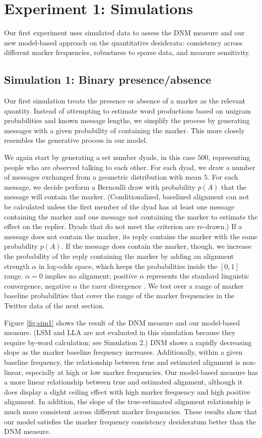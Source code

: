 \documentclass{acm_proc_article-sp}
\begin{document}
\section{Experiment 1: Simulations}
Our first experiment uses simulated data to assess the DNM measure and our new model-based approach on the quantitative desiderata: consistency across different marker frequencies, robustness to sparse data, and measure sensitivity.

\subsection{Simulation 1: Binary presence/absence}
Our first simulation treats the presence or absence of a marker as the relevant quantity. Instead of attempting to estimate word productions based on unigram probabilities and known message lengths, we simplify the process by generating messages with a given probability of containing the marker.  This more closely resembles the generative process in our model.

We again start by generating a set number dyads, in this case $500$, representing people who are observed talking to each other. For each dyad, we draw a number of messages exchanged from a geometric distribution with mean $5$. For each message, we decide perform a Bernoulli draw with probability $p(A)$ that the message will contain the marker.  (Conditionalized, baselined alignment can not be calculated unless the first member of the dyad has at least one message containing the marker and one message not containing the marker to estimate the effect on the replier. Dyads that do not meet the criterion are re-drawn.) If a message does not contain the marker, its reply contains the marker with the same probability $p(A)$. If the message does contain the marker, though, we increase the probability of the reply containing the marker by adding an alignment strength $\alpha$ in log-odds space, which keeps the probabilities inside the $[0,1]$ range. $\alpha = 0$ implies no alignment; positive $\alpha$ represents the standard linguistic convergence, negative $\alpha$ the rarer divergence \cite{Ferrara1991}.  We test over a range of marker baseline probabilities that cover the range of the marker frequencies in the Twitter data of the next section. 

Figure \ref{fig:sim1} shows the result of the DNM measure and our model-based measure.  (LSM and LLA are not evaluated in this simulation because they require by-word calculation; see Simulation 2.) DNM shows a rapidly decreasing slope as the marker baseline frequency increases.  Additionally, within a given baseline frequency, the relationship between true and estimated alignment is non-linear, especially at high or low marker frequencies.  Our model-based measure has a more linear relationship between true and estimated alignment, although it does display a slight ceiling effect with high marker frequency and high positive alignment.  In addition, the slope of the true-estimated alignment relationship is much more consistent across different marker frequencies.  These results show that our model satisfies the marker frequency consistency desideratum better than the DNM measure.
\end{document}
